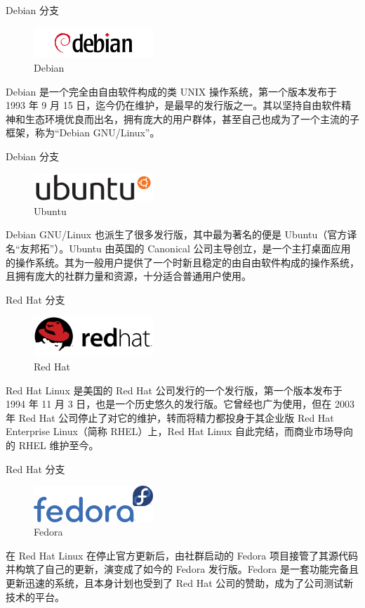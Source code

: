 \documentclass[UTF8]{ctexbeamer}
\begin{document}
\begin{frame}{Debian 分支}
    \begin{figure}
        \centering
        \includegraphics[width=0.4\textwidth]{debian.png}
        \caption{Debian}
        \label{fig:debian}
    \end{figure}
    Debian 是一个完全由自由软件构成的类 UNIX 操作系统，第一个版本发布于 1993 年 9 月 15 日，迄今仍在维护，是最早的发行版之一。其以坚持自由软件精神和生态环境优良而出名，拥有庞大的用户群体，甚至自己也成为了一个主流的子框架，称为“Debian GNU/Linux”。
\end{frame}
\begin{frame}{Debian 分支}
    \begin{figure}
        \centering
        \includegraphics[width=0.4\textwidth]{ubuntu.png}
        \caption{Ubuntu}
        \label{fig:ubuntu}
    \end{figure}
    Debian GNU/Linux 也派生了很多发行版，其中最为著名的便是 Ubuntu（官方译名“友邦拓”）。Ubuntu 由英国的 Canonical 公司主导创立，是一个主打桌面应用的操作系统。其为一般用户提供了一个时新且稳定的由自由软件构成的操作系统，且拥有庞大的社群力量和资源，十分适合普通用户使用。
\end{frame}
\begin{frame}{Red Hat 分支}
    \begin{figure}
        \centering
        \includegraphics[width=0.4\textwidth]{redhat.png}
        \caption{Red Hat}
        \label{fig:redhat}
    \end{figure}
    Red Hat Linux 是美国的 Red Hat 公司发行的一个发行版，第一个版本发布于 1994 年 11 月 3 日，也是一个历史悠久的发行版。它曾经也广为使用，但在 2003 年 Red Hat 公司停止了对它的维护，转而将精力都投身于其企业版 Red Hat Enterprise Linux（简称 RHEL）上，Red Hat Linux 自此完结，而商业市场导向的 RHEL 维护至今。
\end{frame}
\begin{frame}{Red Hat 分支}
    \begin{figure}
        \centering
        \includegraphics[width=0.4\textwidth]{fedora.png}
        \caption{Fedora}
        \label{fig:fedora}
    \end{figure}
    在 Red Hat Linux 在停止官方更新后，由社群启动的 Fedora 项目接管了其源代码并构筑了自己的更新，演变成了如今的 Fedora 发行版。Fedora 是一套功能完备且更新迅速的系统，且本身计划也受到了 Red Hat 公司的赞助，成为了公司测试新技术的平台。
\end{frame}
\end{document}
